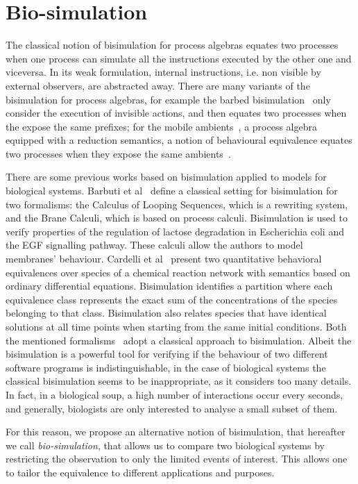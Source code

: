 \section{Bio-simulation}
\label{sec:biosimulation}

The classical notion of bisimulation for process algebras equates two processes
when one process can simulate all the instructions executed by the other one and viceversa.
In its weak formulation, internal instructions, i.e. non visible by external observers,
are abstracted away. 
There are many variants of the bisimulation for process algebras,  for example the
barbed bisimulation~\cite{10.1007/3-540-55719-9_114} only consider the execution of invisible actions, and then equates two processes when the expose the same prefixes; for the mobile ambients~\cite{CardelliG00}, a process algebra equipped with a reduction semantics, a notion of
behavioural equivalence equates two processes when they expose the same ambients~\cite{GC03}. 

There are some previous works based on bisimulation applied to models for biological systems. Barbuti et al~\cite{BMMT08} define a classical setting for bisimulation for two formalisms: the Calculus of Looping Sequences, which is a rewriting system, and the Brane Calculi, which is based on process calculi.
Bisimulation is used to verify properties of the regulation of lactose degradation in
Escherichia coli and the EGF signalling pathway. These calculi allow the authors to model membranes' behaviour.
Cardelli et al~\cite{CTTV15} present two quantitative behavioral equivalences over species of a 
chemical reaction network with semantics based on ordinary differential equations.
Bisimulation identifies a partition where each equivalence class represents the exact sum of the concentrations of the species belonging to that class.
Bisimulation also relates species that have identical solutions at all time points when starting from the same initial conditions.
Both the mentioned formalisms~\cite{BMMT08,CTTV15} adopt a classical approach to bisimulation. 
Albeit the bisimulation is a powerful tool for verifying if the behaviour of two different software 
programs is indistinguishable, in the case of biological systems the classical bisimulation seems to be inappropriate, as it considers too many details.
In fact, in a biological soup, a high number of interactions occur every seconds, and generally, biologists
are only interested to analyse a small subset of them.

For this reason, we propose an alternative notion of bisimulation, that hereafter we call \emph{bio-simulation},
that allows us  to compare two biological systems by restricting the observation to only the limited events of interest.
This allows one to tailor the equivalence to different applications and purposes. 

